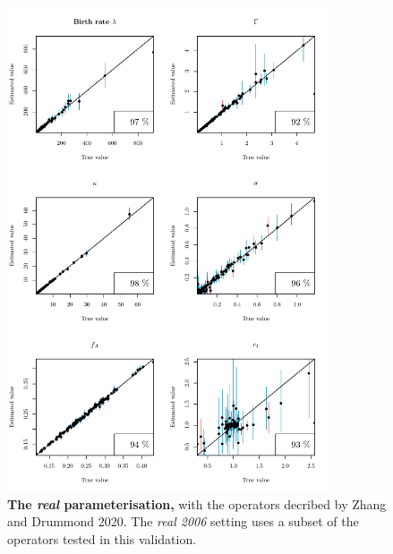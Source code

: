 \documentclass[12pt]{article}
\begin{document}
\begin{figure}[!htb]
\includegraphics[width=0.85\textwidth]{Figures/CalSim_real.pdf}
\caption{\textbf{The \textit{real} parameterisation,} with the operators decribed by Zhang and Drummond 2020. The \textit{real 2006} setting uses a subset of the operators tested in this validation. }
\label{fig:rateparams}
\end{figure}
\end{document}
